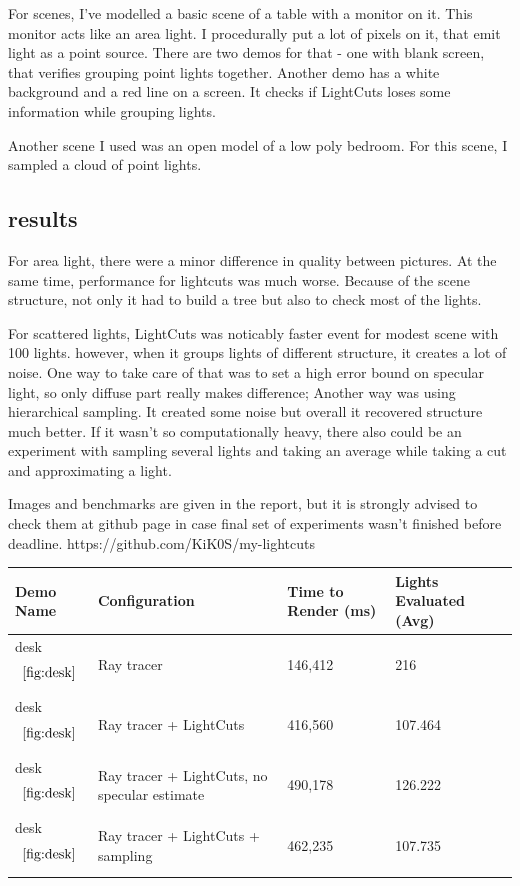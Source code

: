\documentclass[twocolumn]{article}
\begin{document}
For scenes, I've modelled a basic scene of a table with a monitor on it. This monitor acts like an area light. I procedurally put a lot of pixels on it, that emit light as a point source.
There are two demos for that - one with blank screen, that verifies grouping point lights together.
Another demo has a white background and a red line on a screen. It checks if LightCuts loses some information while grouping lights.

Another scene I used was an open model of a low poly bedroom. For this scene, I sampled a cloud of point lights.


\subsection{results}

For area light, there were a minor difference in quality between pictures. At the same time, performance for lightcuts was much worse. Because of the scene structure, not only it had to build a tree but also to check most of the lights.

For scattered lights, LightCuts was noticably faster event for modest scene with 100 lights. however, when it groups lights of different structure, it creates a lot of noise.
One way to take care of that was to set a high error bound on specular light, so only diffuse part really makes difference;
Another way was using hierarchical sampling. It created some noise but overall it recovered structure much better.
If it wasn't so computationally heavy, there also could be an experiment with sampling several lights and taking an average while taking a cut and approximating a light.

Images and benchmarks are given in the report, but it is strongly advised to check them at github page in case final set of experiments wasn't finished before deadline. https://github.com/KiK0S/my-lightcuts 




\begin{table}[h]
    \centering
    \begin{tabular}{|p{1cm}|p{2.5cm}|p{1.5cm}|p{1.5cm}|}
    \hline
    Demo Name & Configuration & Time to Render (ms) & Lights Evaluated (Avg) \\ \hline
    desk \[\ref{fig:desk}\] & Ray tracer & 146,412 & 216  \\ \hline
    desk \[\ref{fig:desk}\]  & Ray tracer + LightCuts & 416,560 & 107.464 \\ \hline
    desk \[\ref{fig:desk}\]& Ray tracer + LightCuts, no specular estimate & 490,178 & 126.222  \\ \hline
    desk \[\ref{fig:desk}\]& Ray tracer + LightCuts + sampling & 462,235 & 107.735 \\ \hline
    \end{tabular}
\end{table}
\end{document}
